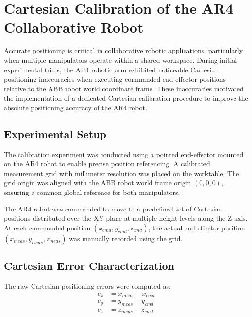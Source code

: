 \section{Cartesian Calibration of the AR4 Collaborative Robot}

\thispagestyle{fancy}
\vspace*{0cm} 
\label{sec:ar4_calibration}

Accurate positioning is critical in collaborative robotic applications, particularly when multiple manipulators operate within a shared workspace. During initial experimental trials, the AR4 robotic arm exhibited noticeable Cartesian positioning inaccuracies when executing commanded end-effector positions relative to the ABB robot world coordinate frame. These inaccuracies motivated the implementation of a dedicated Cartesian calibration procedure to improve the absolute positioning accuracy of the AR4 robot.

\subsection{Experimental Setup}

The calibration experiment was conducted using a pointed end-effector mounted on the AR4 robot to enable precise position referencing. A calibrated measurement grid with millimeter resolution was placed on the worktable. The grid origin was aligned with the ABB robot world frame origin $(0,0,0)$, ensuring a common global reference for both manipulators.

The AR4 robot was commanded to move to a predefined set of Cartesian positions distributed over the XY plane at multiple height levels along the Z-axis. At each commanded position $(x_{cmd}, y_{cmd}, z_{cmd})$, the actual end-effector position $(x_{meas}, y_{meas}, z_{meas})$ was manually recorded using the grid.

\subsection{Cartesian Error Characterization}

The raw Cartesian positioning errors were computed as:
\begin{equation}
\begin{aligned}
e_x &= x_{meas} - x_{cmd} \\
e_y &= y_{meas} - y_{cmd} \\
e_z &= z_{meas} - z_{cmd}
\end{aligned}
\end{equation}


